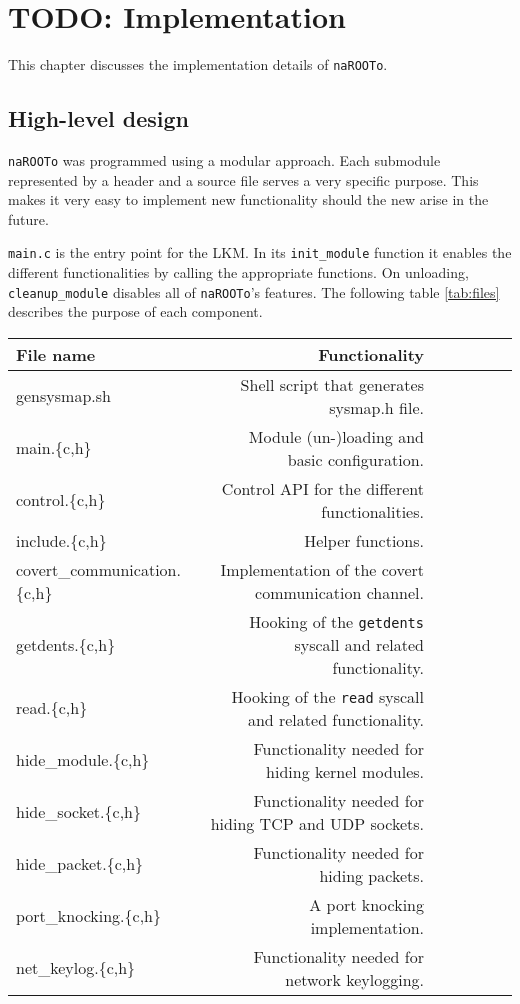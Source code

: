 \documentclass[10pt, letterpaper]{scrartcl}
\begin{document}
\section{TODO: Implementation}\label{sec:implementation}
This chapter discusses the implementation details of \texttt{naROOTo}. 

\subsection{High-level design}
\texttt{naROOTo} was programmed using a modular approach. Each submodule represented by a header and a source file serves a very specific purpose.
This makes it very easy to implement new functionality should the new arise in the future.

\texttt{main.c} is the entry point for the LKM. In its \texttt{init\_module} function it enables the different functionalities by calling the appropriate functions. On unloading, \texttt{cleanup\_module} disables all of \texttt{naROOTo}'s features.
The following table \ref{tab:files} describes the purpose of each component. \\



\begin{tabular}{l*{6}r}
File name             & Functionality \\
\hline
gensysmap.sh & Shell script that generates sysmap.h file.\\
main.\{c,h\} & Module (un-)loading and basic configuration.\\
control.\{c,h\} & Control API for the different functionalities.\\
include.\{c,h\} & Helper functions.\\
covert\_communication.\{c,h\} & Implementation of the covert communication channel.\\
getdents.\{c,h\} & Hooking of the \texttt{getdents} syscall and related functionality.\\
read.\{c,h\} & Hooking of the \texttt{read} syscall and related functionality.\\
hide\_module.\{c,h\} & Functionality needed for hiding kernel modules.\\
hide\_socket.\{c,h\} & Functionality needed for hiding TCP and UDP sockets.\\
hide\_packet.\{c,h\} & Functionality needed for hiding packets. \\
port\_knocking.\{c,h\} & A port knocking implementation.\\
net\_keylog.\{c,h\} & Functionality needed for network keylogging.\\

\end{tabular}
\end{document}
